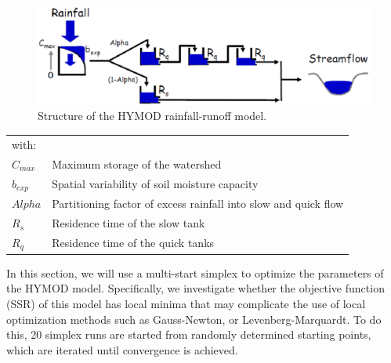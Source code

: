 \begin{figure}[htbp]
  \centering
    \includegraphics[width=1.0\textwidth]{./../eps/hymod.eps}
  \caption{Structure of the HYMOD rainfall-runoff model.}
  \label{fig:hymod}
\end{figure}
\begin{tabular}{ll}
with:&&\\
$C_{max}$&Maximum storage of the watershed\\
$b_{exp}$&Spatial variability of soil moisture capacity\\
$Alpha$&Partitioning factor of excess rainfall into slow and quick flow\\
$R_{s}$&Residence time of the slow tank\\
$R_{q}$&Residence time of the quick tanks\\
\end{tabular}

In this section, we will use a multi-start simplex \citep{neld-mead1965} to optimize the parameters of the HYMOD model. Specifically, we investigate whether the objective function (SSR) of this model has local minima that may complicate the use of local optimization methods such as Gauss-Newton, or Levenberg-Marquardt. To do this, 20 simplex runs are started from randomly determined starting points, which are iterated until convergence is achieved. 





